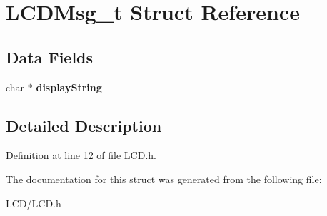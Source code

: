 \hypertarget{struct_l_c_d_msg__t}{}\section{L\+C\+D\+Msg\+\_\+t Struct Reference}
\label{struct_l_c_d_msg__t}
\subsection*{Data Fields}
\begin{DoxyCompactItemize}
\item 
\hypertarget{struct_l_c_d_msg__t_a99a5569881c237a30f933bd8c9091a76}{}char $\ast$ {\bfseries display\+String}\label{struct_l_c_d_msg__t_a99a5569881c237a30f933bd8c9091a76}

\end{DoxyCompactItemize}


\subsection{Detailed Description}


Definition at line 12 of file L\+C\+D.\+h.



The documentation for this struct was generated from the following file\+:\begin{DoxyCompactItemize}
\item 
L\+C\+D/L\+C\+D.\+h\end{DoxyCompactItemize}
